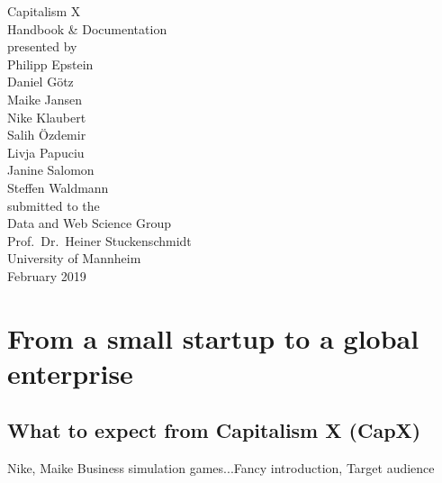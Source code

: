 \documentclass[11pt,titlepage,oneside,openany]{book}
\begin{document}
\begin{titlepage}
	\vspace*{2cm}
  \begin{center}
   {\Large Capitalism X\\}
   \vspace{2cm} 
   {Handbook \& Documentation\\}
   \vspace{2cm}
   {presented by\\
   Philipp Epstein \\
    Daniel G\"otz \\
Maike Jansen \\
Nike Klaubert \\
Salih \"Ozdemir \\
Livja Papuciu \\
Janine Salomon \\
Steffen Waldmann \\
   }
   \vspace{1cm} 
   {submitted to the\\
    Data and Web Science Group\\
    Prof.\ Dr.\ Heiner Stuckenschmidt\\
    University of Mannheim\\} \vspace{2cm}
   {February 2019}
  \end{center}
\end{titlepage} 

\tableofcontents
\newpage

\listoffigures

\listoftables


\newpage

\chapter{From a small startup to a global enterprise}
\label{cha:intro}
\section{What to expect from Capitalism X (CapX)}
Nike, Maike
Business simulation games...Fancy introduction, Target audience
\end{document}
